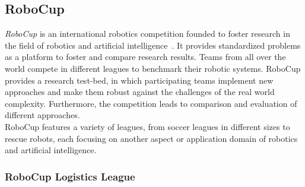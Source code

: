 \documentclass[a4paper,11pt]{article}
\begin{document}
\subsection{RoboCup}
\label{sec:robocup}
\emph{RoboCup} is an international robotics competition founded to
foster research in the field of robotics and artificial
intelligence~\cite{RoboCup-Paper}. It provides standardized problems as a
platform to foster and compare research results.
Teams from all over the world compete in different leagues to
benchmark their robotic systems. RoboCup provides a research
test-bed, in which participating teams implement new approaches and
make them robust against the challenges of the real world
complexity. Furthermore, the competition leads to comparison and
evaluation of different approaches.\\
%
RoboCup features a variety of leagues, from soccer leagues in
different sizes to rescue robots, each focusing on another aspect or
application domain of robotics and artificial intelligence.



\subsubsection{RoboCup Logistics League}
\end{document}
